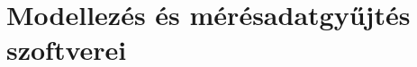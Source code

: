 \documentclass[../../main.tex]{subfiles}
\begin{document}
\chapter{Modellezés és mérésadatgyűjtés szoftverei}























\end{document}
